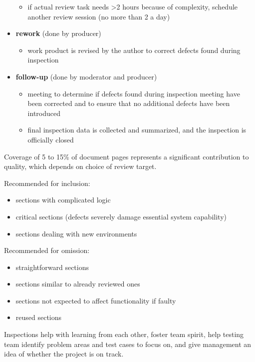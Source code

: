 \documentclass[11pt]{article}
\begin{document}
\begin{itemize}
\begin{itemize}
\item if actual review task needs >2 hours because of complexity, schedule another review session
(no more than 2 a day)
\end{itemize}
\item \textbf{rework} (done by producer)
\begin{itemize}
\item work product is revised by the author to correct defects found during inspection
\end{itemize}
\item \textbf{follow-up} (done by moderator and producer)
\begin{itemize}
\item meeting to determine if defects found during inspection meeting have been corrected and to ensure
that no additional defects have been introduced
\item final inspection data is collected and summarized, and the inspection is officially closed
\end{itemize}
\end{itemize}

Coverage of 5 to 15\% of document pages represents a significant contribution to quality, which
depends on choice of review target.

Recommended for inclusion:
\begin{itemize}
\item sections with complicated logic
\item critical sections (defects severely damage essential system capability)
\item sections dealing with new environments
\end{itemize}

Recommended for omission:
\begin{itemize}
\item straightforward sections
\item sections similar to already reviewed ones
\item sections not expected to affect functionality if faulty
\item reused sections
\end{itemize}

Inspections help with learning from each other, foster team spirit, help testing team identify
problem areas and test cases to focus on, and give management an idea of whether the project is
on track.
\end{document}
